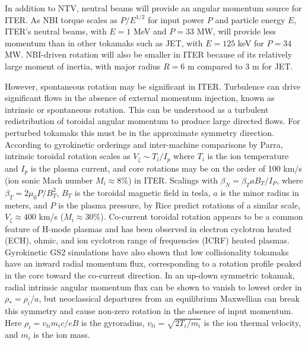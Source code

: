\documentclass[aip, pop, preprint]{revtex4-1}
\numberwithin{figure}{section}
\numberwithin{equation}{section}
\begin{document}
In addition to NTV, neutral beams will provide an angular momentum source for ITER. As NBI torque scales as $P/E^{1/2}$ for input power $P$ and particle energy $E$, ITER's neutral beams, with $E = 1$ MeV and $P = 33$ MW, will provide less momentum than in other tokamaks such as JET, with $E = 125$ keV for $P = 34$ MW.\cite{Ciric2011} NBI-driven rotation will also be smaller in ITER because of its relatively large moment of inertia, with major radius $R = 6$ m compared to 3 m for JET. 

However, spontaneous rotation may be significant in ITER. Turbulence can drive significant flows in the absence of external momentum injection, known as intrinsic or spontaneous rotation. This can be understood as a turbulent redistribution of toroidal angular momentum to produce large directed flows. For perturbed tokamaks this must be in the approximate symmetry direction. According to gyrokinetic orderings and inter-machine comparisons by Parra,\cite{Parra2012} intrinsic toroidal rotation scales as $V_{\zeta} \sim  T_i/I_p$ where $T_i$ is the ion temperature and $I_p$ is the plasma current, and core rotations may be on the order of 100 km/s (ion sonic Mach number $M_i \approx 8\%$) in ITER. Scalings with $\beta_N = \beta_T a B_T/I_P$, where $\beta_T =  2\mu_0 P/B_T^2$, $B_T$ is the toroidal magnetic field in tesla, $a$ is the minor radius in meters, and $P$ is the plasma pressure, by Rice\cite{Rice2007} predict rotations of a similar scale, $V_{\zeta} \approx 400$ km/s ($M_i \approx 30\%$). Co-current toroidal rotation appears to be a common feature of H-mode plasmas and has been observed in electron cyclotron heated (ECH),\cite{DeGrassie2007} ohmic,\cite{DeGrassie2007} and ion cyclotron range of frequencies (ICRF) \cite{Noterdaeme2003} heated plasmas. Gyrokinetic GS2 simulations have also shown that low collisionality tokamaks have an inward radial momentum flux, corresponding to a rotation profile peaked in the core toward the co-current direction.\cite{Barnes2013} In an up-down symmetric tokamak, radial intrinsic angular momentum flux can be shown to vanish to lowest order in $\rho_* = \rho_i/a$, but neoclassical departures from an equilibrium Maxwellian can break this symmetry and cause non-zero rotation in the absence of input momentum.\cite{Barnes2013} Here $\rho_i = v_{ti}m_i c/{eB}$ is the gyroradius, $v_{ti} = \sqrt{2T_i/m_i}$ is the ion thermal velocity, and $m_i$ is the ion mass. 
\end{document}
